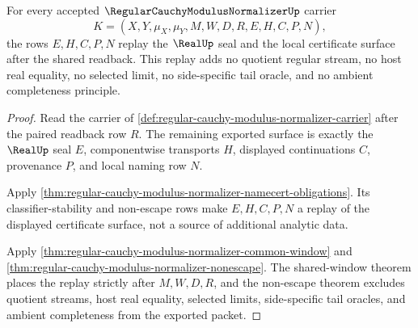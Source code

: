 \begin{theorem}
\label{thm:regular-cauchy-modulus-normalizer-seal-replay-obligation}
For every accepted $\RegularCauchyModulusNormalizerUp$ carrier
$$
K=(X,Y,\mu_X,\mu_Y,M,W,D,R,E,H,C,P,N),
$$
the rows $E,H,C,P,N$ replay the $\RealUp$ seal and the local certificate surface after the shared readback. This replay adds no quotient regular stream, no host real equality, no selected limit, no side-specific tail oracle, and no ambient completeness principle.
\end{theorem}
\begin{proof}
Read the carrier of \autoref{def:regular-cauchy-modulus-normalizer-carrier} after the paired readback row $R$. The remaining exported surface is exactly the $\RealUp$ seal $E$, componentwise transports $H$, displayed continuations $C$, provenance $P$, and local naming row $N$.

Apply \autoref{thm:regular-cauchy-modulus-normalizer-namecert-obligations}. Its classifier-stability and non-escape rows make $E,H,C,P,N$ a replay of the displayed certificate surface, not a source of additional analytic data.

Apply \autoref{thm:regular-cauchy-modulus-normalizer-common-window} and \autoref{thm:regular-cauchy-modulus-normalizer-nonescape}. The shared-window theorem places the replay strictly after $M,W,D,R$, and the non-escape theorem excludes quotient streams, host real equality, selected limits, side-specific tail oracles, and ambient completeness from the exported packet.
\end{proof}

